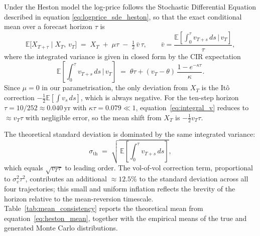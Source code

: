 Under the Heston model the log-price follows the Stochastic Differential Equation described in equation \ref{eq:logprice_sde_heston},
so that the exact conditional mean over a forecast horizon $\tau$ is
\begin{equation}
    \mathbb{E}\bigl[X_{T+\tau}\mid X_T,\,v_T\bigr]
    \;=\;
    X_T \;+\; \mu\tau \;-\; \tfrac{1}{2}\,\bar{v}\,\tau,
    \qquad
    \bar{v} = \frac{\mathbb{E}\!\left[\int_0^\tau v_{T+s}\,ds\,\Big|\,v_T\right]}{\tau},
    \label{eq:heston_mean}
\end{equation}
where the integrated variance is given in closed form by the CIR expectation
\begin{equation}
    \mathbb{E}\!\left[\int_0^\tau v_{T+s}\,ds\,\Big|\,v_T\right]
    \;=\;
    \theta\tau + (v_T - \theta)\,\frac{1 - e^{-\kappa\tau}}{\kappa}.
    \label{eq:integral_v}
\end{equation}
Since $\mu = 0$ in our parametrisation, the only deviation from $X_T$ is the
It\^{o} correction $-\tfrac{1}{2}\mathbb{E}[\int v_s\,ds]$, which is always
negative.  For the ten-step horizon $\tau = 10/252 \approx 0.040$\,yr with
$\kappa\tau = 0.079 \ll 1$, equation~\eqref{eq:integral_v} reduces to
$\approx v_T\tau$ with negligible error, so the mean shift from $X_T$ is
$-\tfrac{1}{2}v_T\tau$.

The theoretical standard deviation is dominated by the same integrated variance:
\begin{equation}
    \sigma_{\mathrm{th}} \;=\; \sqrt{\,\mathbb{E}\!\left[\int_0^\tau v_{T+s}\,ds\right]},
    \label{eq:std_th}
\end{equation}
which equals $\sqrt{v_T\tau}$ to leading order.  The vol-of-vol correction
term, proportional to $\sigma_v^2\tau^2$, contributes an additional
$\approx 12.5\%$ to the standard deviation across all four trajectories;
this small and uniform inflation reflects the brevity of the horizon relative
to the mean-reversion timescale.\\


Table~\ref{tab:mean_consistency} reports the theoretical mean from
equation~\eqref{eq:heston_mean}, together with the empirical means of the
true and generated Monte Carlo distributions.

